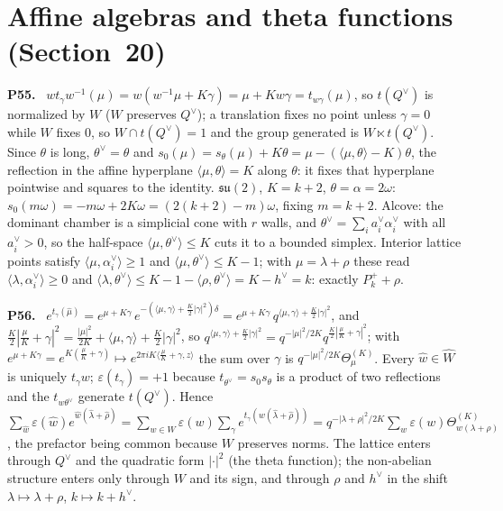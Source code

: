 \documentclass[11pt]{article}
\newenvironment{solution}[1]{\medskip\noindent\textbf{P#1.}\ }{\par\medskip}
\begin{document}
\section*{Affine algebras and theta functions (Section~20)}

\begin{solution}{55}
$wt_\gamma w^{-1}(\mu) = w(w^{-1}\mu+K\gamma) = \mu+Kw\gamma = t_{w\gamma}(\mu)$,
so $t(Q^\vee)$ is normalized by $W$ ($W$ preserves $Q^\vee$); a translation
fixes no point unless $\gamma = 0$ while $W$ fixes $0$, so
$W\cap t(Q^\vee) = 1$ and the group generated is $W\ltimes t(Q^\vee)$.
Since $\theta$ is long, $\theta^\vee = \theta$ and
$s_0(\mu) = s_\theta(\mu)+K\theta = \mu-(\langle\mu,\theta\rangle-K)\theta$,
the reflection in the affine hyperplane $\langle\mu,\theta\rangle = K$
along $\theta$: it fixes that hyperplane pointwise and squares to the
identity. $\mathfrak{su}(2)$, $K = k+2$, $\theta = \alpha = 2\omega$:
$s_0(m\omega) = -m\omega+2K\omega = (2(k+2)-m)\omega$, fixing $m = k+2$.
Alcove: the dominant chamber is a simplicial cone with $r$ walls, and
$\theta^\vee = \sum_ia_i^\vee\alpha_i^\vee$ with all $a_i^\vee>0$, so the
half-space $\langle\mu,\theta^\vee\rangle\le K$ cuts it to a bounded
simplex. Interior lattice points satisfy $\langle\mu,\alpha_i^\vee\rangle\ge1$
and $\langle\mu,\theta^\vee\rangle\le K-1$; with $\mu = \lambda+\rho$ these
read $\langle\lambda,\alpha_i^\vee\rangle\ge0$ and
$\langle\lambda,\theta^\vee\rangle\le K-1-\langle\rho,\theta^\vee\rangle = K-h^\vee = k$:
exactly $P_k^+ + \rho$.
\end{solution}

\begin{solution}{56}
$e^{t_\gamma(\hat\mu)} = e^{\mu+K\gamma}\,e^{-(\langle\mu,\gamma\rangle+\frac K2|\gamma|^2)\delta}
= e^{\mu+K\gamma}\,q^{\langle\mu,\gamma\rangle+\frac K2|\gamma|^2}$, and
$\tfrac K2|\tfrac\mu K+\gamma|^2 = \tfrac{|\mu|^2}{2K}+\langle\mu,\gamma\rangle+\tfrac K2|\gamma|^2$,
so $q^{\langle\mu,\gamma\rangle+\frac K2|\gamma|^2} = q^{-|\mu|^2/2K}q^{\frac K2|\frac\mu K+\gamma|^2}$;
with $e^{\mu+K\gamma} = e^{K(\frac\mu K+\gamma)}\mapsto e^{2\pi iK\langle\frac\mu K+\gamma,z\rangle}$
the sum over $\gamma$ is $q^{-|\mu|^2/2K}\Theta^{(K)}_\mu$. Every
$\hat w\in\hat W$ is uniquely $t_\gamma w$; $\varepsilon(t_\gamma) = +1$
because $t_{\theta^\vee} = s_0s_\theta$ is a product of two reflections and
the $t_{w\theta^\vee}$ generate $t(Q^\vee)$. Hence
$\sum_{\hat w}\varepsilon(\hat w)e^{\hat w(\hat\lambda+\hat\rho)}
= \sum_{w\in W}\varepsilon(w)\sum_\gamma e^{t_\gamma(w(\hat\lambda+\hat\rho))}
= q^{-|\lambda+\rho|^2/2K}\sum_w\varepsilon(w)\Theta^{(K)}_{w(\lambda+\rho)}$,
the prefactor being common because $W$ preserves norms. The lattice enters
through $Q^\vee$ and the quadratic form $|\cdot|^2$ (the theta function);
the non-abelian structure enters only through $W$ and its sign, and
through $\rho$ and $h^\vee$ in the shift $\lambda\mapsto\lambda+\rho$,
$k\mapsto k+h^\vee$.
\end{solution}
\end{document}
